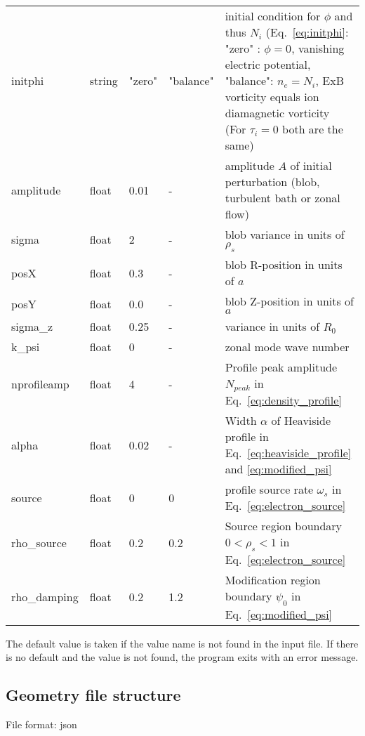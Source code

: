 \begin{longtable}{llll>{\RaggedRight}p{6cm}}
initphi   & string & "zero"  & "balance" & initial condition for $\phi$ and thus $N_i$ (Eq.~\eqref{eq:initphi}: "zero" : $\phi = 0$, vanishing
electric potential, "balance": $n_e=N_i$, ExB vorticity equals ion diamagnetic vorticity (For $\tau_i =0 $ both are the same)
\\
amplitude  & float &0.01   & - & amplitude $A$ of initial perturbation (blob, turbulent bath or zonal flow)  \\
sigma      & float &2      & - & blob variance in units of $\rho_s$ \\
posX       & float &0.3    & - & blob R-position in units of $a$\\
posY       & float &0.0    & - & blob Z-position in units of $a$ \\
sigma\_z    & float &0.25   & - & variance in units of $R_0$  \\
k\_psi     & float &0    & - & zonal mode wave number  \\
nprofileamp& float &4   & - & Profile peak amplitude $N_{peak}$ in Eq.~\eqref{eq:density_profile} \\
alpha       & float & 0.02 & - & Width $\alpha$ of Heaviside profile in Eq.~\eqref{eq:heaviside_profile} and \eqref{eq:modified_psi} \\
source      & float & 0    & 0 & profile source rate $\omega_s$ in Eq.~\eqref{eq:electron_source} \\
rho\_source & float & 0.2  & 0.2 & Source region boundary $0<\rho_{s}<1$ in Eq.~\eqref{eq:electron_source}  \\
rho\_damping& float & 0.2  & 1.2 & Modification region boundary $\psi_0$ in Eq.~\eqref{eq:modified_psi}  \\
\bottomrule
\end{longtable}
The default value is taken if the value name is not found in the input file. If there is no default and
the value is not found,
the program exits with an error message.
\subsection{Geometry file structure}
File format: json

